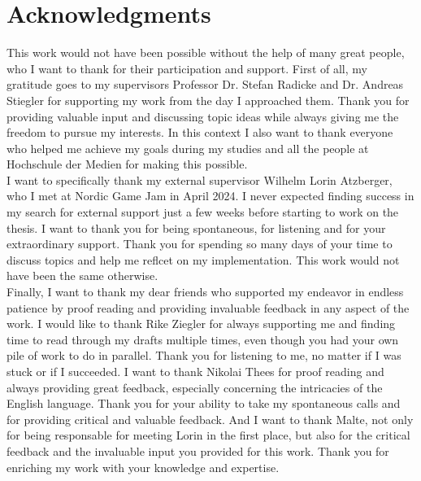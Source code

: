 \chapter{Acknowledgments}

This work would not have been possible without the help of many great people, who I want to thank for their 
participation and support. First of all, my gratitude goes to my supervisors Professor Dr. Stefan Radicke 
and Dr. Andreas Stiegler for supporting my work from the day I approached them. Thank you for providing 
valuable input and discussing topic ideas while always giving me the freedom to pursue my interests. In 
this context I also want to thank everyone who helped me achieve my goals during my studies and all the 
people at Hochschule der Medien for making this possible. \\

\noindent
I want to specifically thank my external supervisor Wilhelm Lorin Atzberger, who I met at Nordic Game Jam 
in April 2024. I never expected finding success in my search for external support just a few weeks before 
starting to work on the thesis. I want to thank you for being spontaneous, for listening and for your 
extraordinary support. Thank you for spending so many days of your time to discuss topics and help me 
reflcet on my implementation. This work would not have been the same otherwise. \\

\noindent
Finally, I want to thank my dear friends who supported my endeavor in endless patience by proof reading and 
providing invaluable feedback in any aspect of the work. I would like to thank Rike Ziegler for always 
supporting me and finding time to read through my drafts multiple times, even though you had your own 
pile of work to do in parallel. Thank you for listening to me, no matter if I was stuck or if I succeeded. 
I want to thank Nikolai Thees for proof reading and always providing great feedback, especially concerning 
the intricacies of the English language. Thank you for your ability to take my spontaneous calls and for 
providing critical and valuable feedback. And I want to thank Malte, not only for being responsable for 
meeting Lorin in the first place, but also for the critical feedback and the invaluable input you provided 
for this work. Thank you for enriching my work with your knowledge and expertise. \\
